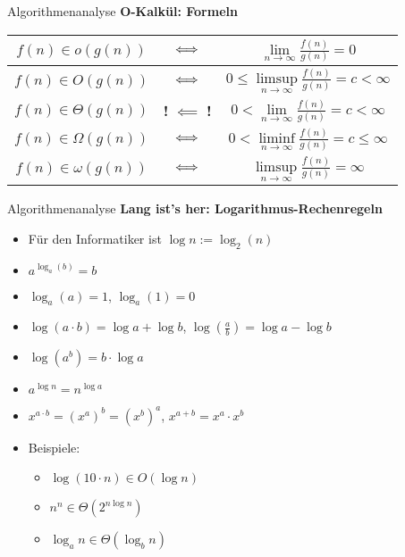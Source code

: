 \begin{frame}{Algorithmenanalyse}
	\textbf{O-Kalkül: Formeln} \\[0,125cm]
	{
		\renewcommand{\arraystretch}{1.7}%
		\begin{center}
			\begin{tabular}{ | c | c | >{\quad}c<{\quad} | }
				\hline
				$f(n) \in o      (g(n))$ & $\Gdw$ & \(\lim\limits_{n \to \infty} \frac{f(n)}{g(n)} = 0\) 
				\\  \hline
				$f(n) \in O      (g(n))$ & $\Gdw$ & \(0 \leq \limsup\limits_{n \to \infty} \frac{f(n)}{g(n)} = c < \infty\)
				\\ \hline
				$f(n) \in \Theta (g(n))$ & \cellcolor{adaptingred} {\textbf{!} $\bm{\impliedby}$ \textbf{!}} & \(0 < \lim\limits_{n \to \infty} \frac{f(n)}{g(n)} = c < \infty\)
				\\ \hline
				$f(n) \in \Omega (g(n))$ & $\Gdw$ & \(0 < \liminf\limits_{n \to \infty} \frac{f(n)}{g(n)} = c \leq \infty\)
				\\ \hline
				$f(n) \in \omega (g(n))$ & $\Gdw$ & \(\limsup\limits_{n \to \infty} \frac{f(n)}{g(n)} = \infty\)
				\\ \hline
			\end{tabular}
		\end{center}
	}
\end{frame}

\begin{frame}{Algorithmenanalyse}
	\textbf{Lang ist's her: Logarithmus-Rechenregeln} \\[0,125cm]
	\begin{itemize}[<+->]
		\item Für den Informatiker ist $\log n := \log_2(n)$
		\item $a^{\log_a(b)} = b$
		\item $\log_a(a) =1$, \quad $\log_a(1) = 0$
		\item $\log(a \cdot b) = \log a + \log b$, \quad $\log(\frac{a}{b}) = \log a - \log b$
		\item $\log(a^b) = b \cdot \log a$
		\item $a^{\log n} = n^{\log a}$
		\item $x^{a \cdot b} = \left(x^a\right)^b = \left(x^b\right)^a$, \quad $x^{a + b} = x^a \cdot x^b$
		\item Beispiele:
		\begin{itemize}
			\item $\log(10 \cdot n) \in O(\log n)$
			\item $n^n \in \Theta(2^{n \log n})$
			\item $\log_a n \in \Theta(\log_b n) $
		\end{itemize}
	\end{itemize}
\end{frame}

